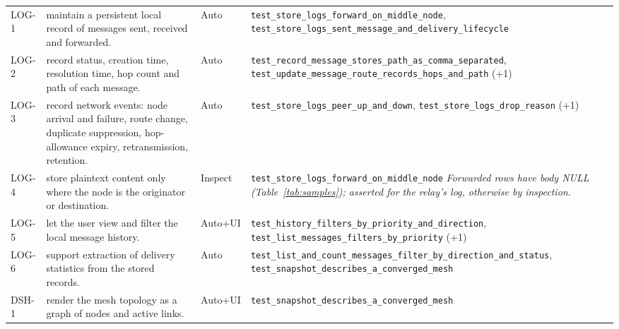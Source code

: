 \begin{longtable}{@{}p{0.95cm}p{6.6cm}p{1.15cm}p{8.6cm}@{}}
LOG-1 & maintain a persistent local record of messages sent, received and forwarded. & Auto & \texttt{test\_\allowbreak{}store\_\allowbreak{}logs\_\allowbreak{}forward\_\allowbreak{}on\_\allowbreak{}middle\_\allowbreak{}node}, \texttt{test\_\allowbreak{}store\_\allowbreak{}logs\_\allowbreak{}sent\_\allowbreak{}message\_\allowbreak{}and\_\allowbreak{}delivery\_\allowbreak{}lifecycle} \\
LOG-2 & record status, creation time, resolution time, hop count and path of each message. & Auto & \texttt{test\_\allowbreak{}record\_\allowbreak{}message\_\allowbreak{}stores\_\allowbreak{}path\_\allowbreak{}as\_\allowbreak{}comma\_\allowbreak{}separated}, \texttt{test\_\allowbreak{}update\_\allowbreak{}message\_\allowbreak{}route\_\allowbreak{}records\_\allowbreak{}hops\_\allowbreak{}and\_\allowbreak{}path} (+1) \\
LOG-3 & record network events: node arrival and failure, route change, duplicate suppression, hop-allowance expiry, retransmission, retention. & Auto & \texttt{test\_\allowbreak{}store\_\allowbreak{}logs\_\allowbreak{}peer\_\allowbreak{}up\_\allowbreak{}and\_\allowbreak{}down}, \texttt{test\_\allowbreak{}store\_\allowbreak{}logs\_\allowbreak{}drop\_\allowbreak{}reason} (+1) \\
LOG-4 & store plaintext content only where the node is the originator or destination. & Inspect & \texttt{test\_\allowbreak{}store\_\allowbreak{}logs\_\allowbreak{}forward\_\allowbreak{}on\_\allowbreak{}middle\_\allowbreak{}node} \textit{Forwarded rows have body NULL (Table~\ref{tab:samples}); asserted for the relay's log, otherwise by inspection.} \\
LOG-5 & let the user view and filter the local message history. & Auto+UI & \texttt{test\_\allowbreak{}history\_\allowbreak{}filters\_\allowbreak{}by\_\allowbreak{}priority\_\allowbreak{}and\_\allowbreak{}direction}, \texttt{test\_\allowbreak{}list\_\allowbreak{}messages\_\allowbreak{}filters\_\allowbreak{}by\_\allowbreak{}priority} (+1) \\
LOG-6 & support extraction of delivery statistics from the stored records. & Auto & \texttt{test\_\allowbreak{}list\_\allowbreak{}and\_\allowbreak{}count\_\allowbreak{}messages\_\allowbreak{}filter\_\allowbreak{}by\_\allowbreak{}direction\_\allowbreak{}and\_\allowbreak{}status}, \texttt{test\_\allowbreak{}snapshot\_\allowbreak{}describes\_\allowbreak{}a\_\allowbreak{}converged\_\allowbreak{}mesh} \\
DSH-1 & render the mesh topology as a graph of nodes and active links. & Auto+UI & \texttt{test\_\allowbreak{}snapshot\_\allowbreak{}describes\_\allowbreak{}a\_\allowbreak{}converged\_\allowbreak{}mesh} \\

\end{longtable}
